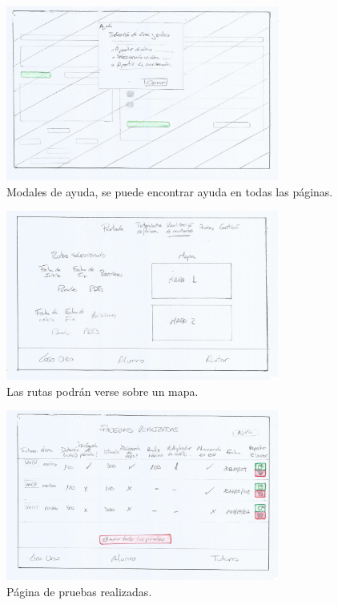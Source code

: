 \begin{figure}[!htbp]
  \centering
    \includegraphics[width=0.8\textwidth]{../img/prototipado/alta/ayuda.png}
  \caption{Modales de ayuda, se puede encontrar ayuda en todas las páginas.}
  \label{ayuda}
\end{figure}

\begin{figure}[!htbp]
  \centering
    \includegraphics[width=0.8\textwidth]{../img/prototipado/alta/mapa.png}
  \caption{Las rutas podrán verse sobre un mapa.}
  \label{mapas}
\end{figure}

\begin{figure}[!htbp]
  \centering
    \includegraphics[width=0.8\textwidth]{../img/prototipado/alta/pruebas.png}
  \caption{Página de pruebas realizadas.}
  \label{pruebas}
\end{figure}


